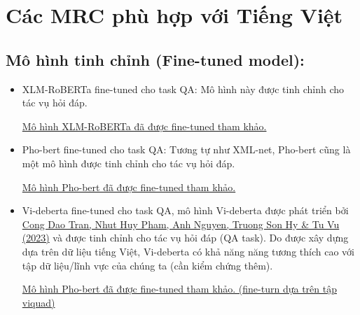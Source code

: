 \section{Các MRC phù hợp với Tiếng Việt}\label{sec:cac-mrc-phu-hop-voi-tieng-viet}

\subsection{Mô hình tinh chỉnh (Fine-tuned model):}\label{subsec:mo-hinh-tinh-chinh-(fine-tuned-model):}
\begin{itemize}
    \item XLM-RoBERTa fine-tuned cho task QA: Mô hình này được tinh chỉnh cho tác vụ hỏi đáp.\\
    \begin{singlespace}
        \href{https://huggingface.co/nguyenvulebinh/vi-mrc-large?context=B%C3%ACnh+Nguy%E1%BB%85n+l%C3%A0+m%E1%BB%99t+ng%C6%B0%E1%BB%9Di+%C4%91am+m%C3%AA+v%E1%BB%9Bi+l%C4%A9nh+v%E1%BB%B1c+x%E1%BB%AD+l%C3%BD+ng%C3%B4n+ng%E1%BB%AF+t%E1%BB%B1+nhi%C3%AAn+.+Anh+nh%E1%BA%ADn+ch%E1%BB%A9ng+ch%E1%BB%89+Google+Developer+Expert+n%C4%83m+2020&text=B%C3%ACnh+%C4%91%C6%B0%E1%BB%A3c+c%C3%B4ng+nh%E1%BA%ADn+v%E1%BB%9Bi+danh+hi%E1%BB%87u+g%C3%AC+%3F}
        {Mô hình XLM-RoBERTa đã được fine-tuned tham khảo.}
    \end{singlespace}
    \item Pho-bert fine-tuned cho task QA: Tương tự như XML-net, Pho-bert cũng là một mô hình được tinh chỉnh cho tác vụ hỏi đáp.\\
    \begin{singlespace}
        \href{https://huggingface.co/duyduong9htv/phobert-qa-finetuned-viet-qa?context=H%C3%A0+n%E1%BB%99i+l%C3%A0+th%E1%BB%A7+%C4%91%C3%B4+c%E1%BB%A7a+Vi%E1%BB%87t+Nam&text=M%E1%BB%91i+quan+h%E1%BB%87+gi%E1%BB%AFa+H%C3%A0+n%E1%BB%99i+v%C3%A0+Vi%E1%BB%87t+Nam%3F}
        {Mô hình Pho-bert đã được fine-tuned tham khảo.}
    \end{singlespace}
    \item
        Vi-deberta fine-tuned cho task QA, mô hình Vi-deberta được phát triển bởi
        \href{https://arxiv.org/pdf/2301.10439}{Cong Dao Tran, Nhut Huy Pham, Anh Nguyen, Truong Son Hy & Tu Vu (2023)}
        và được tinh chỉnh cho tác vụ hỏi đáp (QA task). Do được xây dựng dựa trên dữ liệu tiếng Việt, Vi-deberta có khả
        năng năng tương thích cao với tập dữ liệu/lĩnh vực của chúng ta (cần kiểm chứng thêm).\\
    \begin{singlespace}
        \href{https://huggingface.co/lqbin/videberta-xsmall_batch24_epoch30v6}
        {Mô hình Pho-bert đã được fine-tuned tham khảo. (fine-turn dựa trên tập viquad)}
    \end{singlespace}

\end{itemize}

